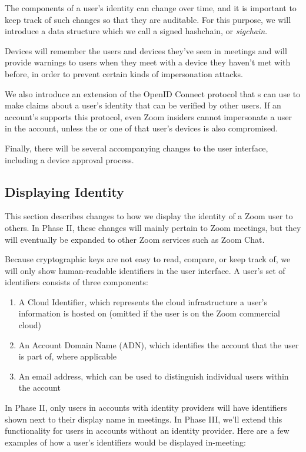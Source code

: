 The components of a user's identity can change over time, and it is important to keep track of such
changes so that they are auditable. For this purpose, we will introduce a data structure which we
call a signed hashchain, or \textit{sigchain}.

Devices will remember the users and devices they've seen in meetings and will provide warnings to
users when they meet with a device they haven't met with before, in order to prevent certain kinds
of impersonation attacks.

We also introduce an extension of the OpenID Connect protocol that {\idp}s can use to make claims
about a user's identity that can be verified by other users. If an account's \idp supports this
protocol, even Zoom insiders cannot impersonate a user in the account, unless the \idp or one of
that user's devices is also compromised.

Finally, there will be several accompanying changes to the user interface, including a device
approval process.

\subsection{Displaying Identity}
\label{subsec:displayid}

This section describes changes to how we display the identity of a Zoom user to others. In Phase II,
these changes will mainly pertain to Zoom meetings, but they will eventually be expanded to other
Zoom services such as Zoom Chat.

Because cryptographic keys are not easy to read, compare, or keep track of, we will only show
human-readable identifiers in the user interface. A user's set of identifiers consists of three
components:

\begin{enumerate}
\item A Cloud Identifier, which represents the cloud infrastructure a user's
    information is hosted on (omitted if the user is on the Zoom commercial cloud)
\item An Account
    Domain Name (ADN), which identifies the account that the user is part of, where applicable
\item
    An email address, which can be used to distinguish individual users within the account
\end{enumerate}

In Phase II, only users in accounts with identity providers will have identifiers shown next to
their display name in meetings. In Phase III, we'll extend this functionality for users in accounts
without an identity provider. Here are a few examples of how a user's identifiers would be
displayed in-meeting:

